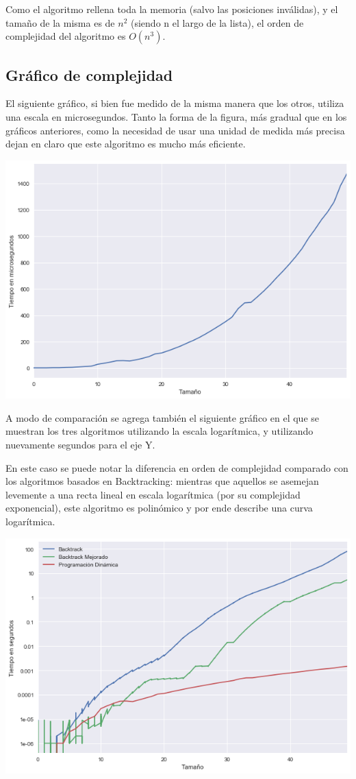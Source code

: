 	Como el algoritmo rellena toda la memoria (salvo las posiciones inválidas), y el tamaño de la misma es de $n^2$ (siendo n el largo de la lista), el orden de complejidad del algoritmo es $O(n^3)$.

	\pagebreak
	\subsection{Gráfico de complejidad}

	El siguiente gráfico, si bien fue medido de la misma manera que los otros, utiliza una escala en microsegundos. Tanto la forma de la figura, más gradual que en los gráficos anteriores, como la necesidad de usar una unidad de medida más precisa dejan en claro que este algoritmo es mucho más eficiente.

	\begin{center}
	\includegraphics[width=.8\textwidth]{ej3.png}
	\end{center}

	A modo de comparación se agrega también el siguiente gráfico en el que se muestran los tres algoritmos utilizando la escala logarítmica, y utilizando nuevamente segundos para el eje Y.

	En este caso se puede notar la diferencia en orden de complejidad comparado con los algoritmos basados en Backtracking: mientras que aquellos se asemejan levemente a una recta lineal en escala logarítmica (por su complejidad exponencial), este algoritmo es polinómico y por ende describe una curva logarítmica.

	\begin{center}
	\includegraphics[width=.8\textwidth]{ej3-2.png}
	\end{center}